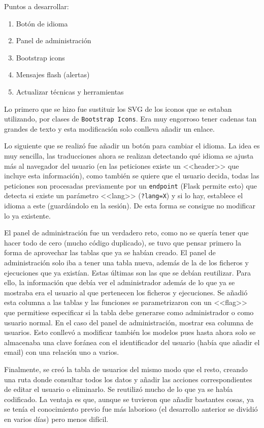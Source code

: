 Puntos a desarrollar:
\begin{enumerate}
    \item Botón de idioma
    \item Panel de administración
    \item Bootstrap icons
    \item Mensajes flash (alertas)
    \item Actualizar técnicas y herramientas
\end{enumerate}

Lo primero que se hizo fue sustituir los SVG de los iconos que se estaban
utilizando, por clases de \texttt{Bootstrap Icons}. Era muy engorroso tener cadenas tan
grandes de texto y esta modificación solo conlleva añadir un enlace.

Lo siguiente que se realizó fue añadir un botón para cambiar el idioma. La idea
es muy sencilla, las traducciones ahora se realizan detectando qué idioma se
ajusta más al navegador del usuario (en las peticiones existe un <<header>> que
incluye esta información), como también se quiere que el usuario decida, todas
las peticiones son procesadas previamente por un \texttt{endpoint} (Flask
permite esto) que detecta si existe un parámetro <<lang>> (\texttt{?lang=X}) y
si lo hay, establece el idioma a este (guardándolo en la sesión). De esta forma
se consigue no modificar lo ya existente.

El panel de administración fue un verdadero reto, como no se quería tener que
hacer todo de cero (mucho código duplicado), se tuvo que pensar primero la forma
de aprovechar las tablas que ya se habían creado. El panel de administración
solo iba a tener una tabla nueva, además de la de los ficheros y ejecuciones que
ya existían. Estas últimas son las que se debían reutilizar. Para ello, la
información que debía ver el administrador además de lo que ya se mostraba era
el usuario al que pertenecen los ficheros y ejecuciones. Se añadió esta columna
a las tablas y las funciones se parametrizaron con un <<flag>> que permitiese
especificar si la tabla debe generarse como administrador o como usuario normal.
En el caso del panel de administración, mostrar esa columna de usuarios. Esto
conllevó a modificar también los modelos pues hasta ahora solo se almacenaba una
clave foránea con el identificador del usuario (había que añadir el email) con
una relación uno a varios.

Finalmente, se creó la tabla de usuarios del mismo modo que el resto, creando
una ruta donde consultar todos los datos y añadir las acciones correspondientes
de editar el usuario o eliminarlo. Se reutilizó mucho de lo que ya se había
codificado. La ventaja es que, aunque se tuvieron que añadir bastantes cosas, ya
se tenía el conocimiento previo fue más laborioso (el desarrollo anterior se
dividió en varios días) pero menos difícil.

